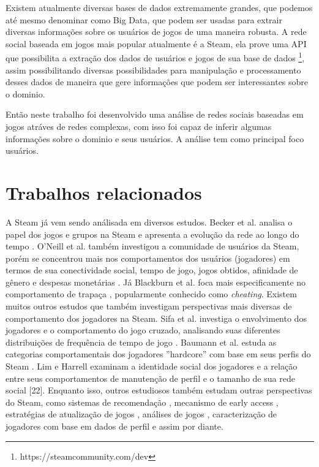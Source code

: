 \documentclass[12pt]{article}
\begin{document}
Existem atualmente diversas bases de dados extremamente grandes, que podemos até mesmo denominar como Big Data, que podem ser usadas para extrair diversas informações sobre os usuários de jogos de uma maneira robusta. A rede social baseada em jogos mais popular atualmente é a Steam, ela prove uma API que possibilita a extração dos dados de usuários e jogos de sua base de dados \footnote{https://steamcommunity.com/dev}, assim possibilitando diversas possibilidades para manipulação e processamento desses dados de maneira que gere informações que podem ser interessantes sobre o dominio.

Então neste trabalho foi desenvolvido uma análise de redes sociais baseadas em jogos atráves de redes complexas, com isso foi capaz de inferir algumas informações sobre o dominio e seus usuários. A análise tem como principal foco usuários.


\section{Trabalhos relacionados} \label{sec:firstpage}

A Steam já vem sendo análisada em diversos estudos. Becker et al. analisa o papel dos jogos e grupos na Steam e apresenta a evolução da rede ao longo do tempo \cite{becker2012analysis}. O'Neill et al. também investigou a comunidade de usuários da Steam, porém se concentrou mais nos comportamentos dos usuários (jogadores) em termos de sua conectividade social, tempo de jogo, jogos obtidos, afinidade de gênero e despesas monetárias \cite{o2016condensing}. Já Blackburn et al. foca mais especificamente no comportamento de trapaça \cite{blackburn2011cheaters}, popularmente conhecido como \textit{cheating}. Existem muitos outros estudos que também investigam perspectivas mais diversas de comportamento dos jogadores na Steam. Sifa et al. investiga o envolvimento dos jogadores e o comportamento do jogo cruzado, analisando suas diferentes distribuições de frequência de tempo de jogo \cite{sifa2014playtime,sifa2015large}. Baumann et al. estuda as categorias comportamentais dos jogadores ''hardcore'' com base em seus perfis do Steam \cite{baumann2018hardcore}. Lim e Harrell examinam a identidade social dos jogadores e a relação entre seus comportamentos de manutenção de perfil e o tamanho de sua rede social [22]. Enquanto isso, outros estudiosos também estudam outras perspectivas do Steam, como sistemas de recomendação \cite{bertens2018machine}, mecanismo de early access \cite{lin2018empirical}, estratégias de atualização de jogos \cite{lin2017studying}, análises de jogos \cite{lin2019empirical}, caracterização de jogadores com base em dados de perfil \cite{li2019statistical} e assim por diante.
\end{document}
